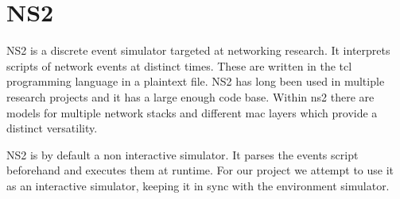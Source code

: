 \section{NS2}
NS2 is a discrete event simulator targeted at networking research. It interprets
scripts of network events at distinct times. These are written in the tcl
programming language in a plaintext file. NS2 has long been used in multiple
research projects and it has a large enough code base. Within ns2 there are
models for multiple network stacks and different mac layers which provide a
distinct versatility.



NS2 is by default a non interactive simulator. It parses the events script beforehand
and executes them at runtime. For our project we attempt to use it as an
interactive simulator, keeping it in sync with the environment simulator.

